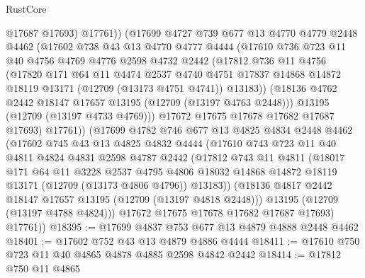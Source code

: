 \begin{lexlean}{RustCore}
\begin{coremodule}
              @17687
              @17693)
            @17761))
        (@17699
          @4727
          @739
          @677
          @13
          @4770
          @4779
          @2448
          @4462
          (@17602
            @738
            @43
            @13
            @4770
            @4777
            @4444
            (@17610
              @736
              @723
              @11
              @40
              @4756
              @4769
              @4776
              @2598
              @4732
              @2442
              (@17812
                @736
                @11
                @4756
                (@17820
                  @171
                  @64
                  @11
                  @4474
                  @2537
                  @4740
                  @4751
                  @17837
                  @14868
                  @14872
                  @18119
                  @13171
                  (@12709 (@13173 @4751 @4741))
                  @13183))
              (@18136 @4762 @2442 @18147 @17657 @13195 (@12709 (@13197 @4763 @2448)))
              @13195
              (@12709 (@13197 @4733 @4769)))
            @17672
            @17675
            @17678
            @17682
            @17687
            @17693)
          @17761))
      (@17699
        @4782
        @746
        @677
        @13
        @4825
        @4834
        @2448
        @4462
        (@17602
          @745
          @43
          @13
          @4825
          @4832
          @4444
          (@17610
            @743
            @723
            @11
            @40
            @4811
            @4824
            @4831
            @2598
            @4787
            @2442
            (@17812
              @743
              @11
              @4811
              (@18017
                @171
                @64
                @11
                @3228
                @2537
                @4795
                @4806
                @18032
                @14868
                @14872
                @18119
                @13171
                (@12709 (@13173 @4806 @4796))
                @13183))
            (@18136 @4817 @2442 @18147 @17657 @13195 (@12709 (@13197 @4818 @2448)))
            @13195
            (@12709 (@13197 @4788 @4824)))
          @17672
          @17675
          @17678
          @17682
          @17687
          @17693)
        @17761))
@18395 := @17699 @4837 @753 @677 @13 @4879 @4888 @2448 @4462
@18401 := @17602 @752 @43 @13 @4879 @4886 @4444
@18411 := @17610 @750 @723 @11 @40 @4865 @4878 @4885 @2598 @4842 @2442
@18414 := @17812 @750 @11 @4865

\end{coremodule}
\end{lexlean}
